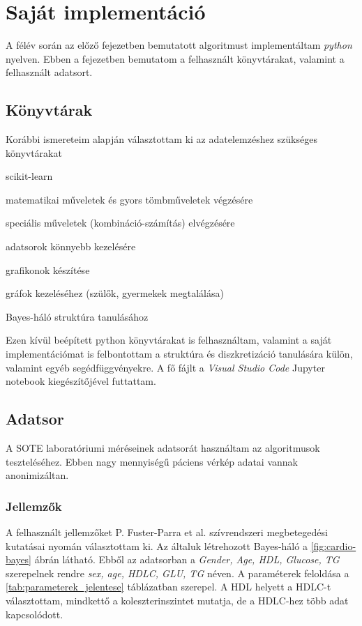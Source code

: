 \chapter{Saját implementáció}

A félév során az előző fejezetben bemutatott algoritmust implementáltam \textit{python} nyelven. Ebben a fejezetben bemutatom a felhasznált könyvtárakat, valamint a felhasznált adatsort.

\section{Könyvtárak}
Korábbi ismereteim alapján választottam ki az adatelemzéshez szükséges könyvtárakat

\begin{labeling}{scikit-learn}
\item[numpy] matematikai műveletek és gyors tömbműveletek végzésére
\item[scikit-learn] speciális műveletek (kombináció-számítás) elvégzésére
\item[pandas] adatsorok könnyebb kezelésére
\item[matplotlib] grafikonok készítése
\item[networkx] gráfok kezeléséhez (szülők, gyermekek megtalálása)
\item[pomegranate] Bayes-háló struktúra tanulásához
\end{labeling}

Ezen kívül beépített python könyvtárakat is felhasználtam, valamint a saját implementációmat is felbontottam a struktúra és diszkretizáció tanulására külön, valamint egyéb segédfüggvényekre. A fő fájlt a \textit{Visual Studio Code} Jupyter notebook kiegészítőjével futtattam.

\section{Adatsor}
A SOTE laboratóriumi méréseinek adatsorát használtam az algoritmusok teszteléséhez. Ebben nagy mennyiségű páciens vérkép adatai vannak anonimizáltan.

\subsection{Jellemzők}
A felhasznált jellemzőket P. Fuster-Parra et al. \cite{fuster2016bayesian} szívrendszeri megbetegedési kutatásai nyomán választottam ki. Az általuk létrehozott Bayes-háló a \ref{fig:cardio-bayes} ábrán látható. Ebből az adatsorban a \emph{Gender, Age, HDL, Glucose, TG} szerepelnek rendre \emph{sex, age, HDLC, GLU, TG} néven. A paraméterek feloldása a \ref{tab:parameterek_jelentese} táblázatban szerepel. A HDL helyett a HDLC-t választottam, mindkettő a koleszterinszintet mutatja, de a HDLC-hez több adat kapcsolódott.

